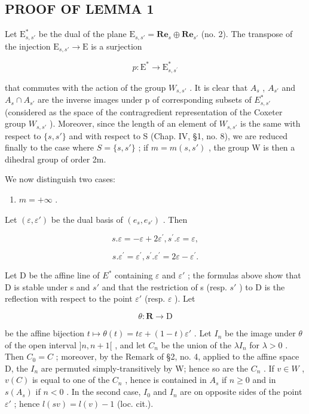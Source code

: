 \subsection{PROOF OF LEMMA 1}

Let \(\mathrm{E}_{s,s'}^*\) be the dual of the plane \(\mathrm{E}_{s,s'} = \mathbf{Re}_s\oplus \mathbf{Re}_{s'}\) (no. 2). The transpose of the injection \(\mathrm{E}_{s,s'}\to \mathrm{E}\) is a surjection

\[
p: \mathrm{E} ^ {*} \to \mathrm{E} _ {s, s ^ {\prime}} ^ {*}
\]

that commutes with the action of the group \(W_{s,s'}\) . It is clear that \(A_{s}\) , \(A_{s'}\) and \(A_{s} \cap A_{s'}\) are the inverse images under p of corresponding subsets of \(E_{s,s'}^{*}\) (considered as the space of the contragredient representation of the Coxeter group \(W_{s,s'}\) ). Moreover, since the length of an element of \(W_{s,s'}\) is the same with respect to \(\{s,s'\}\) and with respect to S (Chap. IV, §1, no. 8), we are reduced finally to the case where \(S = \{s,s'\}\) ; if \(m = m(s,s')\) , the group W is then a dihedral group of order 2m.

We now distinguish two cases:

\begin{enumerate}
\def\labelenumi{\alph{enumi})}
\tightlist
\item
  \(m = +\infty\) .
\end{enumerate}

Let \((\varepsilon, \varepsilon')\) be the dual basis of \((e_s, e_{s'})\) . Then

\[
s. \varepsilon = - \varepsilon + 2 \varepsilon^ {\prime}, s ^ {\prime}. \varepsilon = \varepsilon ,
\]

\[
s. \varepsilon^ {\prime} = \varepsilon^ {\prime}, s ^ {\prime}. \varepsilon^ {\prime} = 2 \varepsilon - \varepsilon^ {\prime}.
\]

Let D be the affine line of \(E^{*}\) containing \(\varepsilon\) and \(\varepsilon'\) ; the formulas above show that D is stable under s and \(s'\) and that the restriction of s (resp. \(s'\) ) to D is the reflection with respect to the point \(\varepsilon'\) (resp. \(\varepsilon\) ). Let

\[
\theta : \mathbf {R} \to \mathrm{D}
\]

be the affine bijection \(t \mapsto \theta(t) = t\varepsilon + (1 - t)\varepsilon'\) . Let \(I_n\) be the image under \(\theta\) of the open interval \(]n, n + 1[\) , and let \(C_n\) be the union of the \(\lambda I_n\) for \(\lambda > 0\) . Then \(C_0 = C\) ; moreover, by the Remark of §2, no. 4, applied to the affine space D, the \(I_n\) are permuted simply-transitively by W; hence so are the \(C_n\) . If \(v \in W\) , \(v(C)\) is equal to one of the \(C_n\) , hence is contained in \(A_s\) if \(n \geqslant 0\) and in \(s(A_s)\) if \(n < 0\) . In the second case, \(I_0\) and \(I_n\) are on opposite sides of the point \(\varepsilon'\) ; hence \(l(sv) = l(v) - 1\) (loc. cit.).

